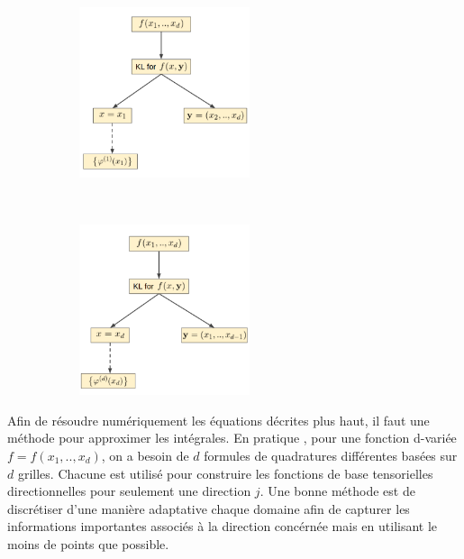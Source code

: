 \begin{center}
\begin{figure}[!h]
    \centering
    \begin{subfigure}[b]{0.45\textwidth}
				\includegraphics[width=\linewidth,height=5cm]{images/tucker_x1.png}
    \end{subfigure}
		~
    \begin{subfigure}[b]{0.45\textwidth}
        \includegraphics[width=\linewidth,height=5cm]{images/tucker_xd.png}
    \end{subfigure}
\end{figure}
\label{figure:tuckerprocess}
\end{center}
Afin de résoudre numériquement les équations décrites plus haut, il faut une méthode pour approximer les intégrales. En pratique , pour une fonction d-variée $f = f(x_1,..,x_d)$, on a besoin
de $d$ formules de quadratures différentes basées sur $d$ grilles. Chacune est utilisé pour construire les fonctions de base tensorielles directionnelles pour seulement une direction $j$.
Une bonne méthode est de discrétiser d'une manière adaptative chaque domaine afin de capturer les informations importantes associés à la direction concérnée mais en utilisant le moins de points que possible.
